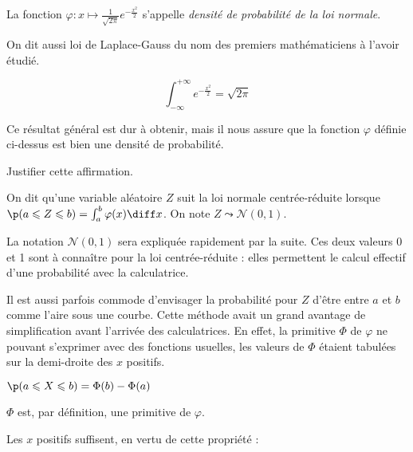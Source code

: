\documentclass[11pt,a4paper,french]{article}
\begin{document}
\begin{definition}
  La fonction $\varphi : x\mapsto \frac1{\sqrt{2\pi}}e^{-\frac{x^2}2}$
  s'appelle \emph{densité de probabilité de la loi normale}.
\end{definition}

On dit aussi loi de Laplace-Gauss du nom des premiers mathématiciens à
l'avoir étudié.

\begin{propriete}[admise]
  \[ \int_{-\infty}^{+\infty} e^{-\frac{x^2}2} = \sqrt{2\pi} \]
\end{propriete}

Ce résultat général est dur à obtenir, mais il nous assure que la
fonction $\varphi$ définie ci-dessus est bien une densité de
probabilité.

\begin{exercice}
  Justifier cette affirmation.
\end{exercice}

\begin{definition}
  On dit qu'une variable aléatoire $Z$ suit la loi normale
  centrée-réduite lorsque $\p(a\leqslant Z \leqslant b) = \int_a^b
  \varphi(x)\diff x$. On note $Z \leadsto \mathcal{N}(0,1)$.
\end{definition}

\begin{remarque} La notation $\mathcal{N}(0,1)$ sera expliquée
  rapidement par la suite. Ces deux valeurs 0 et 1 sont à connaître pour
  la loi centrée-réduite : elles permettent le calcul effectif d'une
  probabilité avec la calculatrice.
\end{remarque}

Il est aussi parfois commode d'envisager la probabilité pour $Z$ d'être
entre $a$ et $b$ comme l'aire sous une courbe. Cette méthode avait un
grand avantage de simplification avant l'arrivée des calculatrices. En
effet, la primitive $\Phi$ de $\varphi$ ne pouvant s'exprimer avec des
fonctions usuelles, les valeurs de $\Phi$ étaient tabulées sur la
demi-droite des $x$ positifs.

\begin{propriete}
  $\p(a \leqslant X \leqslant b) = \Phi(b) - \Phi(a)$
\end{propriete}
\begin{preuve}
  $\Phi$ est, par définition, une primitive de $\varphi$.
\end{preuve}

Les $x$ positifs suffisent, en vertu de cette propriété :
\end{document}
